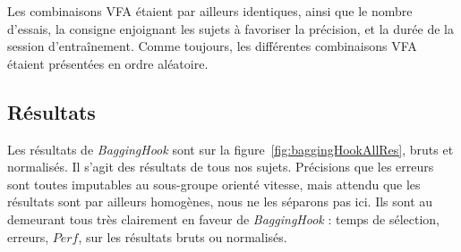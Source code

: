 	Les combinaisons VFA étaient par ailleurs identiques, ainsi que le nombre d'essais, la consigne enjoignant les sujets à favoriser la précision, et la durée de la session d'entraînement. Comme toujours, les différentes combinaisons VFA étaient présentées en ordre aléatoire.
	
	\subsection{Résultats}
	Les résultats de \emph{BaggingHook} sont sur la figure~\ref{fig:baggingHookAllRes}, bruts et normalisés. Il s'agit des résultats de tous nos sujets. Précisions que les erreurs sont toutes imputables au sous-groupe orienté vitesse, mais attendu que les résultats sont par ailleurs homogènes, nous ne les séparons pas ici. Ils sont au demeurant tous très clairement en faveur de \emph{BaggingHook} : temps de sélection, erreurs, $Perf$, sur les résultats bruts ou normalisés.	
	
